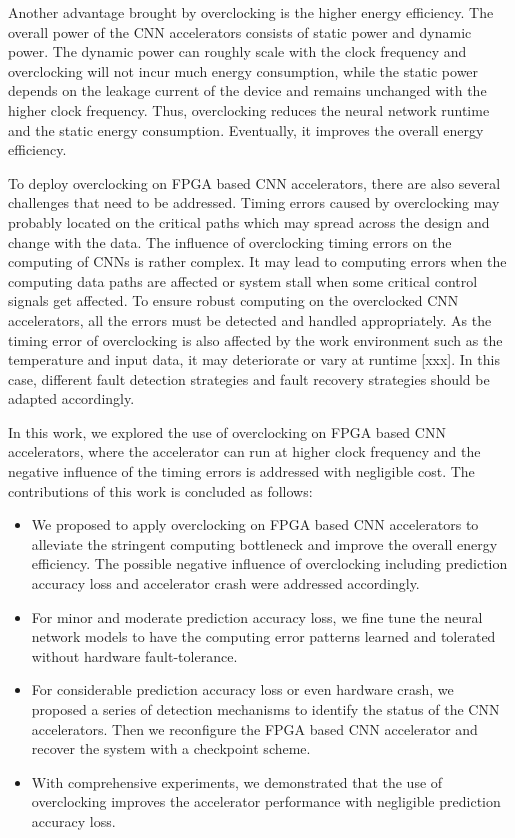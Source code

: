 Another advantage brought by overclocking is the higher 
energy efficiency. The overall power of the CNN accelerators 
consists of static power and dynamic power. The dynamic power 
can roughly scale with the clock frequency and overclocking will not 
incur much energy consumption, while the static power depends on the 
leakage current of the device and remains unchanged with the higher
clock frequency. Thus, overclocking reduces the neural network runtime 
and the static energy consumption. Eventually, it improves 
the overall energy efficiency.

To deploy overclocking on FPGA based CNN accelerators, there are also several
challenges that need to be addressed. Timing errors caused by overclocking 
may probably located on the critical paths which may spread across the 
design and change with the data. The influence of overclocking timing 
errors on the computing of CNNs is rather complex. It may lead to
computing errors when the computing data paths are affected or system stall 
when some critical control signals get affected. To ensure robust computing 
on the overclocked CNN accelerators, all the errors must be detected and 
handled appropriately. As the timing error of overclocking is 
also affected by the work environment such as the temperature 
and input data, it may deteriorate or vary at runtime [xxx]. In this case, 
different fault detection strategies and fault recovery strategies 
should be adapted accordingly. 

In this work, we explored the use of overclocking on FPGA based 
CNN accelerators, where the accelerator can run at higher 
clock frequency and the negative influence of the timing errors 
is addressed with negligible cost. The contributions of this work is 
concluded as follows:

\begin{itemize}
	\item We proposed to apply overclocking on FPGA based CNN accelerators 
		to alleviate the stringent computing bottleneck and improve the 
		overall energy efficiency. The possible negative influence of 
		overclocking including prediction accuracy loss and accelerator 
		crash were addressed accordingly. 

	\item For minor and moderate prediction accuracy loss, we fine tune the 
		neural network models to have the computing error patterns 
		learned and tolerated without hardware fault-tolerance.

	\item For considerable prediction accuracy loss or even hardware crash, we 
		proposed a series of detection mechanisms to identify the status of 
		the CNN accelerators. Then we reconfigure the FPGA based CNN 
		accelerator and recover the system with a checkpoint scheme.

	\item With comprehensive experiments, we demonstrated that the use 
		of overclocking improves the accelerator performance with negligible 
		prediction accuracy loss.
\end{itemize}

